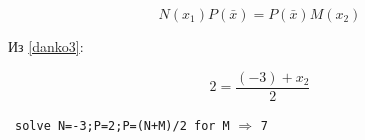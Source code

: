 \begin{equation*}
N(x_1)P(\bar x)=P(\bar x)M(x_2)
\end{equation*}

Из \ref{danko3}:

\begin{equation*}
2 = \frac{(-3)+x_2}{2}
\end{equation*}

\wolfram\ \verb|solve N=-3;P=2;P=(N+M)/2 for M| $\Rightarrow$ \verb|7|



\secup



\secup